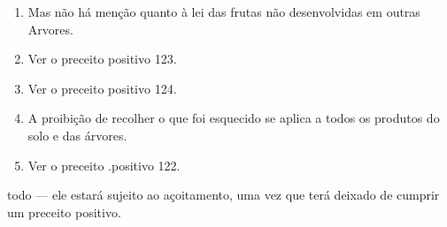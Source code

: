 \begin{enumerate}
\def\labelenumi{\arabic{enumi}.}
\setcounter{enumi}{379}
\item
 
 Mas não há menção quanto à lei das frutas não desenvolvidas em outras
 Arvores.
 
\item
 
 Ver o preceito positivo 123.
 
\item
 
 Ver o preceito positivo 124.
 
\item
 
 A proibição de recolher o que foi esquecido se aplica a todos os
 produtos do solo e das árvores.
 
\item
 
 Ver o preceito .positivo 122.
 
\end{enumerate}

todo --- ele estará sujeito ao açoitamento, uma vez que terá deixado de
cumprir um preceito positivo.

